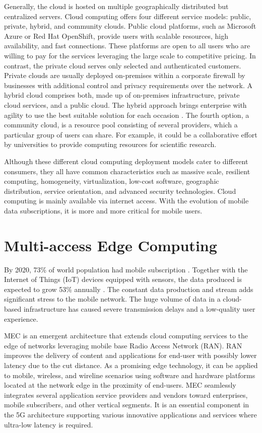 Generally, the cloud is hosted on multiple geographically distributed but centralized servers. Cloud computing offers four different service models: public, private, hybrid, and community clouds. Public cloud platforms, such as Microsoft Azure or Red Hat OpenShift, provide users with scalable resources, high availability, and fast connections. These platforms are open to all users who are willing to pay for the services leveraging the large scale to competitive pricing. In contrast, the private cloud serves only selected and authenticated customers. Private clouds are usually deployed on-premises within a corporate firewall by businesses with additional control and privacy requirements over the network. A hybrid cloud comprises both, made up of on-premises infrastructure, private cloud services, and a public cloud. The hybrid approach brings enterprise with agility to use the best suitable solution for each occasion \cite{NetApp}. The fourth option, a community cloud, is a resource pool consisting of several providers, which a particular group of users can share. For example, it could be a collaborative effort by universities to provide computing resources for scientific research. \cite{MicrosoftAzure}\cite{Taleb2017}\cite{Xing2012}

Although these different cloud computing deployment models cater to different consumers, they all have common characteristics such as massive scale, resilient computing, homogeneity, virtualization, low-cost software, geographic distribution, service orientation, and advanced security technologies. Cloud computing is mainly available via internet access. With the evolution of mobile data subscriptions, it is more and more critical for mobile users.

\section{Multi-access Edge Computing}

By 2020, 73\% of world population had mobile subscription \cite{StatistaMobileSubscribers}. Together with the Internet of Things (IoT) devices equipped with sensors, the data produced is expected to grow 53\% annually \cite{Ning2019}. The constant data production and stream adds significant stress to the mobile network. The huge volume of data in a cloud-based infrastructure has caused severe transmission delays and a low-quality user experience.

MEC is an emergent architecture that extends cloud computing services to the edge of networks leveraging mobile base Radio Access Network (RAN). RAN improves the delivery of content and applications for end-user with possibly lower latency due to the cut distance. As a promising edge technology, it can be applied to mobile, wireless, and wireline scenarios using software and hardware platforms located at the network edge in the proximity of end-users. MEC seamlessly integrates several application service providers and vendors toward enterprises, mobile subscribers, and other vertical segments. It is an essential component in the 5G architecture supporting various innovative applications and services where ultra-low latency is required. \cite{Abbas2018}

